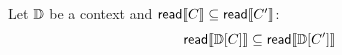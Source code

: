 \begin{lemma}%
  Let $\mathbb{D}$ be a context
and ${\mathsf{read}}\llbracket C\rrbracket \subseteq {\mathsf{read}}\llbracket C'\rrbracket$:
\begin{displaymath}
  \readc\sem{\bCtxt\hole{\aCmd}} \subseteq \readc\sem{\bCtxt\hole{\aCmd'}}
\end{displaymath}
\end{lemma}
